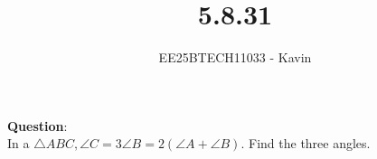 \documentclass[journal]{IEEEtran}
\begin{document}

\vspace{3cm}

\title{5.8.31}
\author{EE25BTECH11033 - Kavin}
{\let\newpage\relax\maketitle}

\renewcommand{\thefigure}{\theenumi}
\renewcommand{\thetable}{\theenumi}
\setlength{\intextsep}{10pt} %
\textbf{Question}:\\
In a $\triangle ABC,  \angle C=3 \angle B=2(\angle A+\angle B)$.  Find the three angles. 
\bigskip
\end{document}
